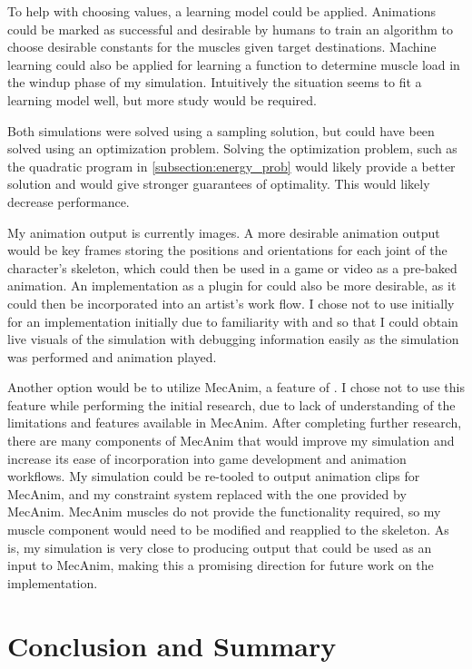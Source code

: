 To help with choosing values, a learning model could be applied.  Animations could be marked as successful and desirable by humans to train an algorithm to choose desirable constants for the muscles given target destinations.  Machine learning could also be applied for learning a function to determine muscle load in the windup phase of my simulation.  Intuitively the situation seems to fit a learning model well, but more study would be required.

Both simulations were solved using a sampling solution, but could have been solved using an optimization problem.  Solving the optimization problem, such as the quadratic program in \ref{subsection:energy_prob} would likely provide a better solution and would give stronger guarantees of optimality.  This would likely decrease performance.

My animation output is currently images.  A more desirable animation output would be key frames storing the positions and orientations for each joint of the character's skeleton, which could then be used in a game or video as a pre-baked animation.  An implementation as a plugin for \maya{} could also be more desirable, as it could then be incorporated into an artist's work flow.  I chose not to use \maya{} initially for an implementation initially due to familiarity with \unity{} and so that I could obtain live visuals of the simulation with debugging information easily as the simulation was performed and animation played.

Another option would be to utilize MecAnim, a feature of \unity{}.  I chose not to use this feature while performing the initial research, due to lack of understanding of the limitations and features available in MecAnim.  After completing further research, there are many components of MecAnim that would improve my simulation and increase its ease of incorporation into game development and animation workflows.  My simulation could be re-tooled to output animation clips for MecAnim, and my constraint system replaced with the one provided by MecAnim.  MecAnim muscles do not provide the functionality required, so my muscle component would need to be modified and reapplied to the skeleton.  As is, my simulation is very close to producing output that could be used as an input to MecAnim, making this a promising direction for future work on the implementation.

\section{Conclusion and Summary}
\label{section:conclusion}

